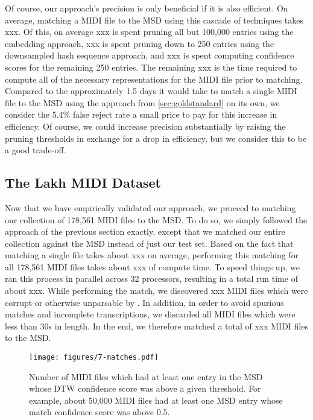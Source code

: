 Of course, our approach's precision is only beneficial if it is also efficient.
On average, matching a MIDI file to the MSD using this cascade of techniques takes xxx.
Of this, on average xxx is spent pruning all but 100,000 entries using the embedding approach, xxx is spent pruning down to 250 entries using the downsampled hash sequence approach, and xxx is spent computing confidence scores for the remaining 250 entries.
The remaining xxx is the time required to compute all of the necessary representations for the MIDI file prior to matching.
Compared to the approximately 1.5 days it would take to match a single MIDI file to the MSD using the approach from \cref{sec:goldstandard} on its own, we consider the 5.4\% false reject rate a small price to pay for this increase in efficiency.
Of course, we could increase precision substantially by raising the pruning thresholds in exchange for a drop in efficiency, but we consider this to be a good trade-off.

\subsection{The Lakh MIDI Dataset}

Now that we have empirically validated our approach, we proceed to matching our collection of 178,561 MIDI files to the MSD.
To do so, we simply followed the approach of the previous section exactly, except that we matched our entire collection against the MSD instead of just our test set.
Based on the fact that matching a single file takes about xxx on average, performing this matching for all 178,561 MIDI files takes about xxx of compute time.
To speed things up, we ran this process in parallel across 32 processors, resulting in a total run time of about xxx.
While performing the match, we discovered xxx MIDI files which were corrupt or otherwise unparsable by \prettymidi{}.
In addition, in order to avoid spurious matches and incomplete transcriptions, we discarded all MIDI files which were less than 30s in length.
In the end, we therefore matched a total of xxx MIDI files to the MSD.

\begin{figure}
  \texttt{[image: figures/7-matches.pdf]}
  \caption[Number of MIDI files with matches above a given confidence]{Number of MIDI files which had at least one entry in the MSD whose DTW confidence score was above a given threshold.
 For example, about 50,000 MIDI files had at least one MSD entry whose match confidence score was above 0.5.}
  \label{fig:match_confidences}
\end{figure}

